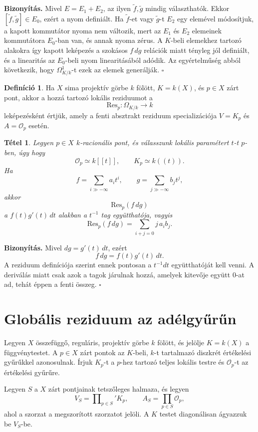 \documentclass[a4paper,12pt]{article}
\theoremstyle{definition}
\newtheorem{definition}{Definíció}[section]
\newenvironment{biz}{\par\noindent\textbf{Bizonyítás.}\enspace\ignorespaces}
{\hfill$\square$\par}
\theoremstyle{plain}
\newtheorem{theorem}{Tétel}[section]
\theoremstyle{remark}
\newcommand{\Res}{\mathrm{Res}}
\newcommand{\cO}{\mathcal{O}}
\begin{document}
\begin{biz}
Mivel $E=E_1+E_2$, az ilyen $\tilde f,\tilde g$ mindig választhatók. Ekkor $[\tilde f,\tilde g]\in E_0$, ezért a nyom definiált.
Ha $\tilde f$-et vagy $\tilde g$-t $E_2$ egy elemével módosítjuk, a kapott kommutátor nyoma nem változik, mert az $E_1$ és $E_2$ elemeinek kommutátora $E_0$-ban van, és annak nyoma zérus.
A $K$-beli elemekhez tartozó alakokra így kapott leképezés a szokásos $f\,dg$ relációk miatt tényleg jól definiált, és a linearitás az $E_0$-beli nyom linearitásából adódik.
Az egyértelműség abból következik, hogy $\Omega^1_{K/k}$-t ezek az elemek generálják.
\end{biz}

\begin{definition}
Ha $X$ sima projektív görbe $k$ fölött, $K=k(X)$, és $p\in X$ zárt pont, akkor a hozzá tartozó lokális reziduumot a
\[
\Res_p:\Omega_{K/k}\to k
\]
leképezésként értjük, amely a fenti absztrakt reziduum specializációja $V=K_p$ és $A=\cO_p$ esetén.
\end{definition}

\begin{theorem}
Legyen $p\in X$ $k$-racionális pont, és válasszunk lokális paramétert $t$-t $p$-ben, úgy hogy
\[
\cO_p\simeq k[[t]],\qquad K_p\simeq k((t)).
\]
Ha
\[
f=\sum_{i\gg-\infty} a_i t^i,\qquad g=\sum_{j\gg-\infty} b_j t^j,
\]
akkor
\[
\Res_p(f\,dg)
\]
a $f(t)g'(t)\,dt$ alakban a $t^{-1}$ tag együtthatója, vagyis
\[
\Res_p(f\,dg)=\sum_{i+j=0} j\,a_i b_j.
\]
\end{theorem}

\begin{biz}
Mivel $dg=g'(t)\,dt$, ezért
\[
f\,dg=f(t)g'(t)\,dt.
\]
A reziduum definíciója szerint ennek pontosan a $t^{-1}dt$ együtthatóját kell venni. A deriválás miatt csak azok a tagok járulnak hozzá, amelyek kitevője együtt $0$-at ad, tehát éppen a fenti összeg.
\end{biz}
\section{Globális reziduum az adélgyűrűn}

Legyen $X$ összefüggő, reguláris, projektív görbe $k$ fölött, és jelölje $K=k(X)$ a függvénytestet. A $p\in X$ zárt pontok az $K$-beli, $k$-t tartalmazó diszkrét értékelési gyűrűkkel azonosulnak. Írjuk $K_p$-t a $p$-hez tartozó teljes lokális testre és $\cO_p$-t az értékelési gyűrűre.

Legyen $S$ a $X$ zárt pontjainak tetszőleges halmaza, és legyen
\[
V_S=\prod\nolimits_{p\in S}' K_p,\qquad A_S=\prod_{p\in S}\cO_p,
\]
ahol a szorzat a megszorított szorzatot jelöli. A $K$ testet diagonálisan ágyazzuk be $V_S$-be.
\end{document}
